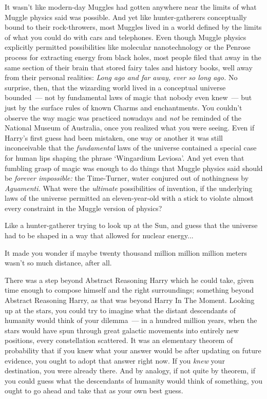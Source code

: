 It wasn't like modern-day Muggles had gotten anywhere near the limits of what Muggle physics said was possible. And yet like hunter-gatherers conceptually bound to their rock-throwers, most Muggles lived in a world defined by the limits of what you could do with cars and telephones. Even though Muggle physics explicitly permitted possibilities like molecular nanotechnology or the Penrose process for extracting energy from black holes, most people filed that away in the same section of their brain that stored fairy tales and history books, well away from their personal realities: \emph{Long ago and far away, ever so long ago.} No surprise, then, that the wizarding world lived in a conceptual universe bounded~--- not by fundamental laws of magic that nobody even knew~--- but just by the surface rules of known Charms and enchantments. You couldn't observe the way magic was practiced nowadays and \emph{not} be reminded of the National Museum of Australia, once you realized what you were seeing. Even if Harry's first guess had been mistaken, one way or another it was still inconceivable that the \emph{fundamental} laws of the universe contained a special case for human lips shaping the phrase `Wingardium Leviosa'. And yet even that fumbling grasp of magic was enough to do things that Muggle physics said should be \emph{forever impossible:} the Time-Turner, water conjured out of nothingness by \emph{Aguamenti.} What were the \emph{ultimate} possibilities of invention, if the underlying laws of the universe permitted an eleven-year-old with a stick to violate almost every constraint in the Muggle version of physics?

Like a hunter-gatherer trying to look up at the Sun, and guess that the universe had to be shaped in a way that allowed for nuclear energy...

It made you wonder if maybe twenty thousand million million million meters wasn't so much distance, after all.

There was a step beyond Abstract Reasoning Harry which he could take, given time enough to compose himself and the right surroundings; something beyond Abstract Reasoning Harry, as that was beyond Harry In The Moment. Looking up at the stars, you could try to imagine what the distant descendants of humanity would think of your dilemma~--- in a hundred million years, when the stars would have spun through great galactic movements into entirely new positions, every constellation scattered. It was an elementary theorem of probability that if you knew what your answer would be after updating on future evidence, you ought to adopt that answer right now. If you \emph{knew} your destination, you were already there. And by analogy, if not quite by theorem, if you could guess what the descendants of humanity would think of something, you ought to go ahead and take that as your own best guess.

